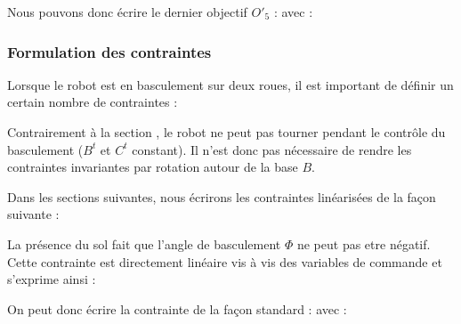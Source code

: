					Nous pouvons donc écrire le dernier objectif $O'_5$ :
					avec : 

			\subsubsection{Formulation des contraintes}
			
				Lorsque le robot est en basculement sur deux roues, il est important de définir un certain nombre de contraintes :
				
				Contrairement à la section , le robot ne peut pas tourner pendant le contrôle du basculement ($B^t$ et $C^t$ constant).
				Il n'est donc pas nécessaire de rendre les contraintes invariantes par rotation autour de la base $B$.
				
				Dans les sections suivantes, nous écrirons les contraintes linéarisées de la façon suivante :
				
				
					La présence du sol fait que l'angle de basculement $\Phi$ ne peut pas etre négatif.
					Cette contrainte est directement linéaire vis à vis des variables de commande et s'exprime ainsi :
					
					On peut donc écrire la contrainte de la façon standard :
					avec :
				
